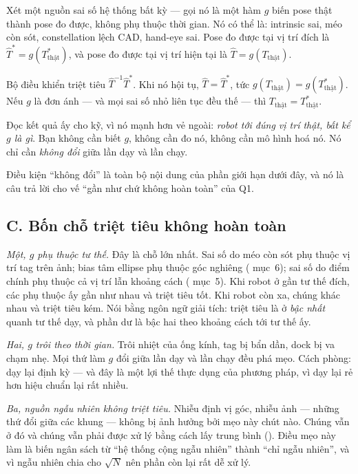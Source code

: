 \documentclass[../../marker.tex]{subfiles}
\begin{document}
Xét một nguồn sai số hệ thống bất kỳ --- gọi nó là một hàm \(g\) biến pose thật thành pose đo được, không phụ thuộc thời gian. Nó có thể là: intrinsic sai, méo còn sót, constellation lệch CAD, hand-eye sai. Pose đo được tại vị trí đích là \(\hat{T}^* = g(T^*_{\text{thật}})\), và pose đo được tại vị trí hiện tại là \(\hat{T} = g(T_{\text{thật}})\).

Bộ điều khiển triệt tiêu \(\hat{T}^{-1}\hat{T}^*\). Khi nó hội tụ, \(\hat{T} = \hat{T}^*\), tức \(g(T_{\text{thật}}) = g(T^*_{\text{thật}})\). Nếu \(g\) là đơn ánh --- và mọi sai số nhỏ liên tục đều thế --- thì \(T_{\text{thật}} = T^*_{\text{thật}}\).

Đọc kết quả ấy cho kỹ, vì nó mạnh hơn vẻ ngoài: \emph{robot tới đúng vị trí thật, bất kể \(g\) là gì}. Bạn không cần biết \(g\), không cần đo nó, không cần mô hình hoá nó. Nó chỉ cần \emph{không đổi} giữa lần dạy và lần chạy.

Điều kiện ``không đổi'' là toàn bộ nội dung của phần giới hạn dưới đây, và nó là câu trả lời cho vế ``gần như chứ không hoàn toàn'' của Q1.

\subsection{C. Bốn chỗ triệt tiêu không hoàn toàn}

\emph{Một, \(g\) phụ thuộc tư thế.} Đây là chỗ lớn nhất. Sai số do méo còn sót phụ thuộc vị trí tag trên ảnh; bias tâm ellipse phụ thuộc góc nghiêng ( mục~6); sai số do điểm chính phụ thuộc cả vị trí lẫn khoảng cách ( mục~5). Khi robot ở gần tư thế đích, các phụ thuộc ấy gần như nhau và triệt tiêu tốt. Khi robot còn xa, chúng khác nhau và triệt tiêu kém. Nói bằng ngôn ngữ giải tích: triệt tiêu là ở \emph{bậc nhất} quanh tư thế dạy, và phần dư là bậc hai theo khoảng cách tới tư thế ấy.

\emph{Hai, \(g\) trôi theo thời gian.} Trôi nhiệt của ống kính, tag bị bẩn dần, dock bị va chạm nhẹ. Mọi thứ làm \(g\) đổi giữa lần dạy và lần chạy đều phá mẹo. Cách phòng: dạy lại định kỳ --- và đây là một lợi thế thực dụng của phương pháp, vì dạy lại rẻ hơn hiệu chuẩn lại rất nhiều.

\emph{Ba, nguồn ngẫu nhiên không triệt tiêu.} Nhiễu định vị góc, nhiễu ảnh --- những thứ đổi giữa các khung --- không bị ảnh hưởng bởi mẹo này chút nào. Chúng vẫn ở đó và chúng vẫn phải được xử lý bằng cách lấy trung bình (). Điều mẹo này làm là biến ngân sách từ ``hệ thống cộng ngẫu nhiên'' thành ``chỉ ngẫu nhiên'', và vì ngẫu nhiên chia cho \(\sqrt{N}\) nên phần còn lại rất dễ xử lý.
\end{document}
